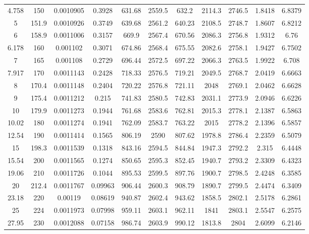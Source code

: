 \begin{longtable}{ccccccccccc}
	4.758   & 150   & 0.0010905 & 0.3928   & 631.68 & 2559.5 & 632.2  & 2114.3 & 2746.5 & 1.8418 & 6.8379      \\
	5       & 151.9 & 0.0010926 & 0.3749   & 639.68 & 2561.2 & 640.23 & 2108.5 & 2748.7 & 1.8607 & 6.8212      \\
	6       & 158.9 & 0.0011006 & 0.3157   & 669.9  & 2567.4 & 670.56 & 2086.3 & 2756.8 & 1.9312 & 6.76        \\
	6.178   & 160   & 0.001102  & 0.3071   & 674.86 & 2568.4 & 675.55 & 2082.6 & 2758.1 & 1.9427 & 6.7502      \\
	7       & 165   & 0.001108  & 0.2729   & 696.44 & 2572.5 & 697.22 & 2066.3 & 2763.5 & 1.9922 & 6.708       \\
	7.917   & 170   & 0.0011143 & 0.2428   & 718.33 & 2576.5 & 719.21 & 2049.5 & 2768.7 & 2.0419 & 6.6663      \\
	8       & 170.4 & 0.0011148 & 0.2404   & 720.22 & 2576.8 & 721.11 & 2048   & 2769.1 & 2.0462 & 6.6628      \\
	9       & 175.4 & 0.0011212 & 0.215    & 741.83 & 2580.5 & 742.83 & 2031.1 & 2773.9 & 2.0946 & 6.6226      \\
	10      & 179.9 & 0.0011273 & 0.1944   & 761.68 & 2583.6 & 762.81 & 2015.3 & 2778.1 & 2.1387 & 6.5863      \\
	10.02   & 180   & 0.0011274 & 0.1941   & 762.09 & 2583.7 & 763.22 & 2015   & 2778.2 & 2.1396 & 6.5857      \\
	12.54   & 190   & 0.0011414 & 0.1565   & 806.19 & 2590   & 807.62 & 1978.8 & 2786.4 & 2.2359 & 6.5079      \\
	15      & 198.3 & 0.0011539 & 0.1318   & 843.16 & 2594.5 & 844.84 & 1947.3 & 2792.2 & 2.315  & 6.4448      \\
	15.54   & 200   & 0.0011565 & 0.1274   & 850.65 & 2595.3 & 852.45 & 1940.7 & 2793.2 & 2.3309 & 6.4323      \\
	19.06   & 210   & 0.0011726 & 0.1044   & 895.53 & 2599.5 & 897.76 & 1900.7 & 2798.5 & 2.4248 & 6.3585      \\
	20      & 212.4 & 0.0011767 & 0.09963  & 906.44 & 2600.3 & 908.79 & 1890.7 & 2799.5 & 2.4474 & 6.3409      \\
	23.18   & 220   & 0.00119   & 0.08619  & 940.87 & 2602.4 & 943.62 & 1858.5 & 2802.1 & 2.5178 & 6.2861      \\
	25      & 224   & 0.0011973 & 0.07998  & 959.11 & 2603.1 & 962.11 & 1841   & 2803.1 & 2.5547 & 6.2575      \\
	27.95   & 230   & 0.0012088 & 0.07158  & 986.74 & 2603.9 & 990.12 & 1813.8 & 2804   & 2.6099 & 6.2146      \\

\end{longtable}
